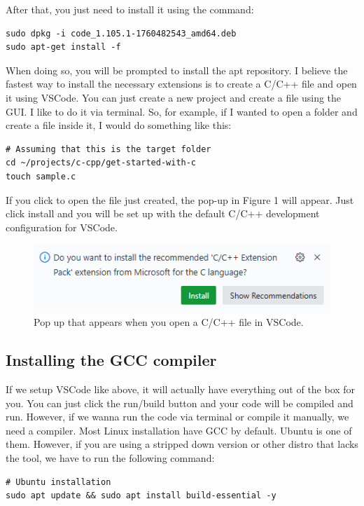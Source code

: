 \documentclass{article}
\begin{document}
After that, you just need to install it using the command:

\begin{verbatim}
sudo dpkg -i code_1.105.1-1760482543_amd64.deb
sudo apt-get install -f
\end{verbatim}

When doing so, you will be prompted to install the apt repository. I believe the fastest way to install the necessary extensions is to create a C/C++ file and open it using VSCode. You can just create a new project and create a file using the GUI. I like to do it via terminal. So, for example, if I wanted to open a folder and create a file inside it, I would do something like this:
\begin{verbatim}
# Assuming that this is the target folder
cd ~/projects/c-cpp/get-started-with-c
touch sample.c
\end{verbatim}

If you click to open the file just created, the pop-up in Figure 1 will appear. Just click install and you will be set up with the default C/C++ development configuration for VSCode.
\begin{figure}
\centering
\includegraphics[width=0.25\linewidth]{./images/c-cpp-extension-popup.png}
\caption{\label{fig:extension-popup}Pop up that appears when you open a C/C++ file in VSCode.}
\end{figure}


\subsection{Installing the GCC compiler}
If we setup VSCode like above, it will actually have everything out of the box for you. You can just click the run/build button and your code will be compiled and run. However, if we wanna run the code via terminal or compile it manually, we need a compiler. Most Linux installation have GCC by default. Ubuntu is one of them. However, if you are using a stripped down version or other distro that lacks the tool, we have to run the following command:

\begin{verbatim}
# Ubuntu installation
sudo apt update && sudo apt install build-essential -y
\end{verbatim}
\end{document}
